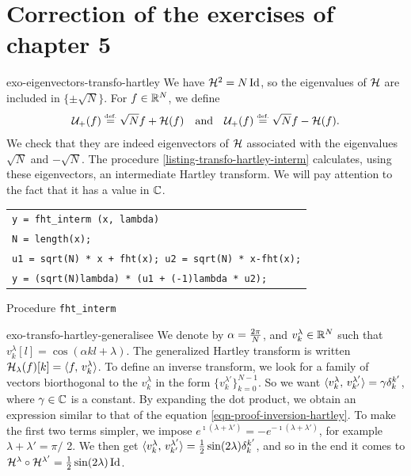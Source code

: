 \section{Correction of the exercises of chapter 5}
 
 
\begin{correction}{exo-eigenvectors-transfo-hartley}
We have $ \mathcal{H}^2 = N \operatorname{Id} $, so the eigenvalues of $ \mathcal{H} $ are included in $ \{\pm \sqrt{N}\} $. For $ f \in \mathbb{R}^N $, we define
\begin{equation*}
\mathcal{U}_+ (f) \stackrel{\mbox{\upshape\tiny def.}}{=} \sqrt{N} f + \mathcal{H} (f) \quad \text{and} \quad \mathcal{U}_+ (f) \stackrel{\mbox{\upshape\tiny def.}}{=} \sqrt{N} f - \mathcal{H} (f).
\end{equation*}
We check that they are indeed eigenvectors of $ \mathcal{H} $ associated with the eigenvalues $ \sqrt{N} $ and $ - \sqrt{N} $. The procedure \Matlab{} \ref{listing-transfo-hartley-interm} calculates, using these eigenvectors, an intermediate Hartley transform. We will pay attention to the fact that it has a value in $ \mathbb{C} $.

\begin{listing} \begin{footnotesize}
{\upshape
\begin{tabular}{l} \texttt{\pfunction y = fht\_interm (x, lambda)} \\
\texttt{N = length(x);} \\
\texttt{u1 = sqrt(N) * x + fht(x); u2 = sqrt(N) * x-fht(x);} \\
\texttt{y = (sqrt(N){\hatverb}lambda) * (u1 + (-1){\hatverb}lambda * u2);} \\
\end{tabular}
} 
\end{footnotesize}
\caption{Procedure \texttt{\upshape fht\_interm}}
\label{listing-transfo-hartley-interm}
\end{listing}
\end{correction}
 
 
\begin{correction}{exo-transfo-hartley-generalisee}
We denote by $ \alpha = \frac{2 \pi}{N} $, and $ v_k^\lambda \in \mathbb{R}^N $ such that $ v_k^\lambda [l] = \cos (\alpha kl + \lambda) $. The generalized Hartley transform is written $ \mathcal{H}_\lambda (f) [k] = \langle f,\,v_k^\lambda\rangle $. To define an inverse transform, we look for a family of vectors biorthogonal to the $ v_k^\lambda $ in the form $ \{v_k^{\lambda'}\}_{k = 0}^{N-1} $. So we want $ \langle v_k^{\lambda},\,v_{k'}^{\lambda'}\rangle = \gamma \delta_k^{k'} $, where $ \gamma \in \mathbb{C} $ is a constant. By expanding the dot product, we obtain an expression similar to that of the equation \eqref{eqn-proof-inversion-hartley}. To make the first two terms simpler, we impose $ e^{\imath (\lambda + \lambda')} = - e^{- \imath (\lambda + \lambda')} $, for example $ \lambda + \lambda'= \pi/$ 2. We then get $ \langle v_k^{\lambda},\,v_{k'}^{\lambda'}\rangle = \frac{1}{2} \sin(2 \lambda) \delta_k^{k'} $, and so in the end it comes to $ \mathcal{H}^\lambda \circ \mathcal{H}^{\lambda'} = \frac{1}{2} \sin(2 \lambda) \operatorname{Id} $.
\end{correction}
 
